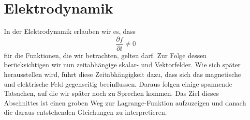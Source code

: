 %
%
%
%
\section{Elektrodynamik\label{section:maxwell:elektrodynmaik}}
In der Elektrodynamik erlauben wir es, dass
\[
\frac{\partial f}{\partial t}
\neq
0
\]
für die Funktionen, die wir betrachten, gelten darf.
Zur Folge dessen berücksichtigen wir nun zeitabhängige skalar- und Vektorfelder.
Wie sich später herausstellen wird, führt diese Zeitabhängigkeit dazu, dass sich das magnetische und elektrische Feld gegenseitig beeinflussen.
Daraus folgen einige spannende Tatsachen, auf die wir später noch zu Sprechen kommen.
Das Ziel dieses Abschnittes ist einen groben Weg zur Lagrange-Funktion aufzuzeigen und danach die daraus entstehenden Gleichungen zu interpretieren.
